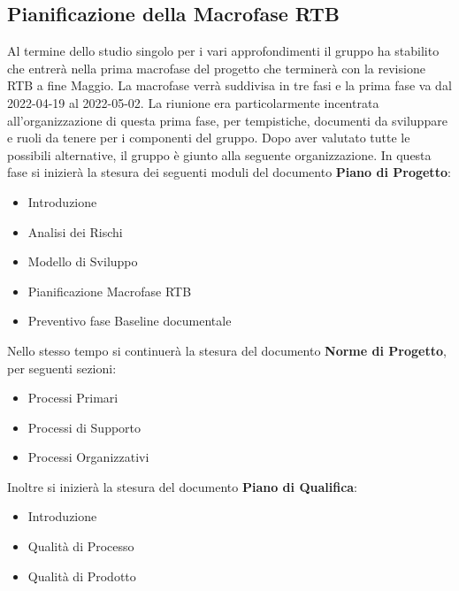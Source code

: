 \subsection{Pianificazione della Macrofase RTB}
Al termine dello studio singolo per i vari approfondimenti il gruppo ha stabilito che entrerà nella prima macrofase del progetto che terminerà con la revisione RTB a fine Maggio. 
La macrofase verrà suddivisa in tre fasi e la prima fase va dal 2022-04-19 al 2022-05-02.
La riunione era particolarmente incentrata all'organizzazione di questa prima fase, per tempistiche, documenti da sviluppare e ruoli da tenere per i componenti del gruppo. Dopo aver valutato tutte le possibili alternative, il gruppo è giunto alla seguente organizzazione. \newline
In questa fase si inizierà la stesura dei seguenti moduli del documento \textbf{Piano di Progetto}:
\begin{itemize}
	\item Introduzione
	\item Analisi dei Rischi
	\item Modello di Sviluppo
	\item Pianificazione Macrofase RTB
	\item Preventivo fase Baseline documentale
\end{itemize}
Nello stesso tempo si continuerà la stesura del documento \textbf{Norme di Progetto}, per seguenti sezioni:
\begin{itemize}
	\item Processi Primari
	\item Processi di Supporto
	\item Processi Organizzativi
\end{itemize}
Inoltre si inizierà la stesura del documento \textbf{Piano di Qualifica}:
\begin{itemize}
	\item Introduzione
	\item Qualità di Processo
	\item Qualità di Prodotto
\end{itemize}

